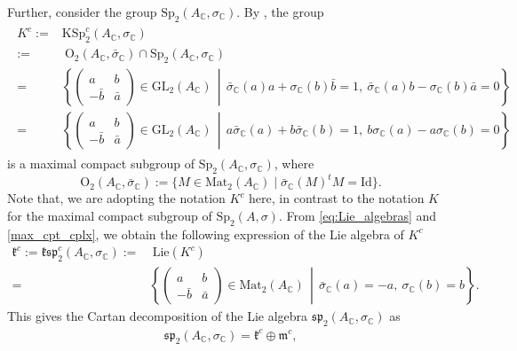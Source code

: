 \documentclass[oneside,11pt]{amsart}
\theoremstyle{definition}
\theoremstyle{remark}
\newcommand{\midwd}{\,\middle\vert\,}
\numberwithin{thm}{section}
\numberwithin{equation}{section}
\begin{document}
Further, consider the group $\mathrm{Sp}_2(A_\mathbb{C},\sigma_\mathbb{C})$. By {\cite[Proposition 3.22, Theorem 3.23]{ABRRW}}, the group 
\begin{align}\label{max_cpt_cplx}
    \begin{aligned}
    K^c :=&\mathrm{KSp}^c_2(A_\mathbb C,\sigma_\mathbb C)\\
    :=&\ \mathrm{O}_2(A_\mathbb{C},\bar \sigma_\mathbb{C})\cap\mathrm{Sp}_2(A_\mathbb{C},\sigma_\mathbb{C})\\
    =&\left\{\begin{pmatrix}
    a&b\\
    -\bar b&\bar a
    \end{pmatrix}
    \in\mathrm{GL}_2(A_\mathbb{C})\midwd \bar\sigma_\mathbb{C}(a)a+\sigma_\mathbb{C}(b)\bar b=1,\ \bar\sigma_\mathbb{C}(a)b-\sigma_\mathbb{C}(b)\bar a=0\right\}\\
    = & \left\{\begin{pmatrix}
    a & b\\
    -\bar b & \bar a
    \end{pmatrix}    \in\mathrm{GL}_2(A_\mathbb{C})
    \midwd a\bar\sigma_\mathbb{C}(a)+b\bar\sigma_\mathbb{C}(b)=1,\ b\sigma_\mathbb{C}(a)-a\sigma_\mathbb{C}(b)=0\right\}
\end{aligned}
\end{align}
is a maximal compact subgroup of $\mathrm{Sp}_2(A_\mathbb{C},\sigma_\mathbb{C})$, where 
$$\mathrm{O}_2(A_\mathbb{C},\bar \sigma_\mathbb{C}):=\{M\in\mathrm{Mat}_2(A_\mathbb{C})\mid \bar \sigma_\mathbb{C}(M)^tM=\mathrm{Id}\}.$$ Note that, we are adopting the notation $K^c$ here, in contrast to the notation $K$ for the maximal compact subgroup of $\mathrm{Sp}_2(A,\sigma)$. From \eqref{eq:Lie_algebras} and \eqref{max_cpt_cplx}, we obtain the following expression of the Lie algebra of $K^c$
\begin{align}\label{eq1.8}
    \mathfrak{k}^c:=\mathfrak{ksp}^c_2(A_\mathbb C,\sigma_\mathbb C):=&\ \mathrm{Lie}(K^c)\\
    =& \left\{\begin{pmatrix}
    a&b\\
    -\bar b&\bar a
    \end{pmatrix}\in\mathrm{Mat}_2(A_\mathbb{C})\midwd \bar\sigma_\mathbb{C}(a)=-a,\ \sigma_\mathbb{C}(b)=b\right\}.
\end{align}
This gives the Cartan decomposition of the Lie algebra $\mathfrak{sp}_2(A_\mathbb{C},\sigma_\mathbb{C})$ as
\begin{align}\label{Cartan_cplx}
    \mathfrak{sp}_2(A_\mathbb{C},\sigma_\mathbb{C})=\mathfrak{k}^c\oplus\mathfrak{m}^c,
\end{align}
\end{document}
